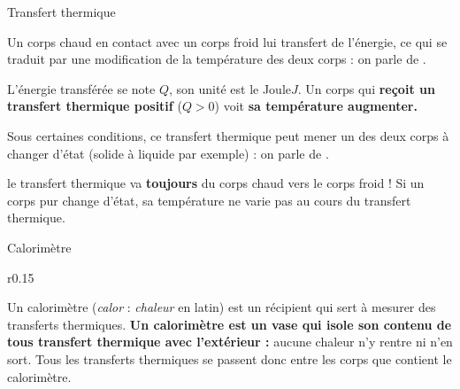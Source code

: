 \begin{doc}{Transfert thermique}
  \vspace*{-20pt}
  \begin{encart}
    Un corps chaud en contact avec un corps froid lui transfert de l'énergie, ce qui se traduit par une modification de la température des deux corps : on parle de .
  \end{encart}
  L'énergie transférée se note $Q$, son unité est le Joule$\unit{J}$.
  Un corps qui \textbf{reçoit un transfert thermique positif} ($Q > 0$) voit \textbf{sa température augmenter.}
  
  \begin{encart}
    Sous certaines conditions, ce transfert thermique peut mener un des deux corps à changer d'état (solide à liquide par exemple) : on parle de .
  \end{encart}
  \attention le transfert thermique va \textbf{toujours} du corps chaud vers le corps froid !
  Si un corps pur change d'état, sa température ne varie pas au cours du transfert thermique.
\end{doc}

\begin{doc}{Calorimètre}
  \vspace*{-34pt}
  \begin{wrapfigure}{r}{0.15\linewidth}
    \centering
    \vspace*{-8pt}
  \end{wrapfigure}
  
  Un calorimètre (\og \textit{calor} \fg : \textit{chaleur} en latin) est un récipient qui sert à mesurer des transferts thermiques.
  \textbf{Un calorimètre est un vase qui isole son contenu de tous transfert thermique avec l'extérieur :} aucune chaleur n'y rentre ni n'en sort.
  Tous les transferts thermiques se passent donc entre les corps que contient le calorimètre.
\end{doc}

